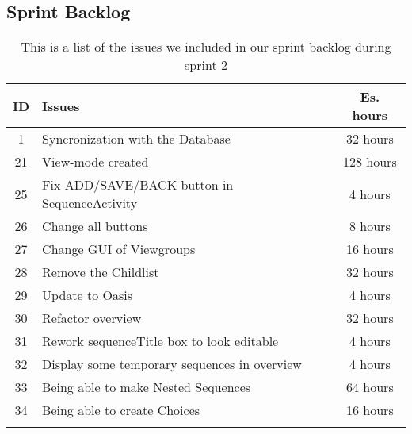 \subsection{Sprint Backlog}\label{subsec:spr2_sprblog}
\begin{longtable} { | c | p{12cm} | c | } 
\hline
	ID 	&	Issues	&		 Es. hours \\\hline
	1	& 	Syncronization with the Database	&	32 hours	\\\hline
	21	& 	View-mode created	&	128 hours	\\\hline	
	25	& 	Fix ADD/SAVE/BACK button in SequenceActivity	&	4 hours	\\\hline
	26	& 	Change all buttons	&	8 hours	\\\hline
	27	& 	Change GUI of Viewgroups	&	16 hours	\\\hline
	28	& 	Remove the Childlist	&	32 hours	\\\hline
	29	& 	Update to Oasis	&	4 hours	\\\hline
	30	& 	Refactor overview	&	32 hours	\\\hline
	31	& 	Rework sequenceTitle box to look editable	&	4 hours	\\\hline
	32	& 	Display some temporary sequences in overview	&	4 hours	\\\hline
	33 	&	Being able to make Nested Sequences	&	64 hours \\\hline
	34 	&	Being able to create Choices	&	16 hours \\\hline
\caption{This is a list of the issues we included in our sprint backlog during sprint 2}
\label{tab:spr2_prodblog}
\end{longtable}